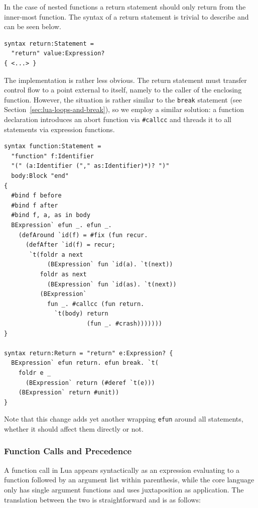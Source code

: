\documentclass{kththesis}
\begin{document}
In the case of nested functions a return statement should only return from the inner-most function. The syntax of a return statement is trivial to describe and can be seen below.

\begin{verbatim}
syntax return:Statement =
  "return" value:Expression?
{ <...> }
\end{verbatim}

The implementation is rather less obvious. The return statement must transfer control flow to a point external to itself, namely to the caller of the enclosing function. However, the situation is rather similar to the \texttt{break} statement (see Section~\ref{sec:lua-loops-and-break}), so we employ a similar solution: a function declaration introduces an abort function via \texttt{#callcc} and threads it to all statements via expression functions.

\begin{verbatim}
syntax function:Statement =
  "function" f:Identifier
  "(" (a:Identifier ("," as:Identifier)*)? ")"
  body:Block "end"
{
  #bind f before
  #bind f after
  #bind f, a, as in body
  BExpression` efun _. efun _.
    (defAround `id(f) = #fix (fun recur.
      (defAfter `id(f) = recur;
       `t(foldr a next
            (BExpression` fun `id(a). `t(next))
          foldr as next
            (BExpression` fun `id(as). `t(next))
          (BExpression`
            fun _. #callcc (fun return.
              `t(body) return
                       (fun _. #crash)))))))
}

syntax return:Return = "return" e:Expression? {
  BExpression` efun return. efun break. `t(
    foldr e _
      (BExpression` return (#deref `t(e)))
    (BExpression` return #unit))
}
\end{verbatim}

Note that this change adds yet another wrapping \texttt{efun} around all statements, whether it should affect them directly or not.

\subsubsection{Function Calls and Precedence} \label{sec:lua-func-call-precedence}

A function call in Lua appears syntactically as an expression evaluating to a function followed by an argument list within parenthesis, while the core language only has single argument functions and uses juxtaposition as application. The translation between the two is straightforward and is as follows:
\end{document}
